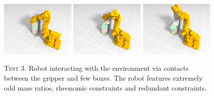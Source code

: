 \documentclass[AMA,STIX1COL]{WileyNJD-v2}
\begin{document}
\begin{figure}[!tbp]
  \centering
	\includegraphics[width=0.32\textwidth]{pics/robot_80.png}
  \includegraphics[width=0.32\textwidth]{pics/robot_200.png}
	\includegraphics[width=0.32\textwidth]{pics/robot_280.png}
	\hfill
  \caption{\textsc{Test 3}. Robot interacting with the environment via contacts between the gripper and few boxes. The robot features extremely odd mass ratios, rheonomic constraints and redundant constraints.}
	\label{fig:robot}
\end{figure}
\end{document}
